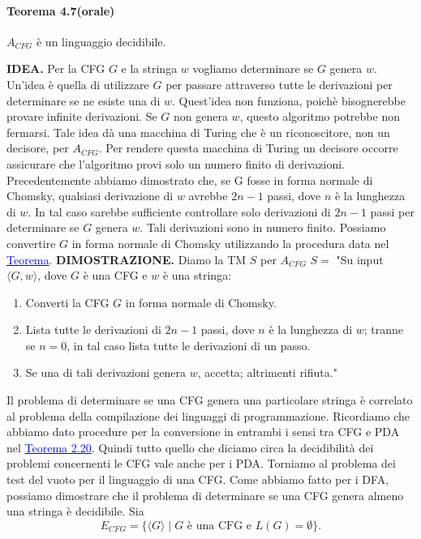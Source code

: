 \documentclass{article}
\begin{document}
\paragraph{Teorema 4.7(orale)}
\label{teorema-4.7}
$A_{CFG}$ è un linguaggio decidibile.
\newline

\hbox{\textbf{IDEA.}}
Per la CFG $G$ e la stringa $w$ vogliamo determinare se $G$ genera $w$.
Un'idea è quella di utilizzare $G$ per passare attraverso tutte le derivazioni per determinare se ne esiste una di $w$.
Quest'idea non funziona, poichè bisognerebbe provare infinite derivazioni.
Se $G$ non genera $w$, questo algoritmo potrebbe non fermarsi.
Tale idea dà una macchina di Turing che è un riconoscitore, non un decisore, per $A_{CFG}$.
Per rendere questa macchina di Turing un decisore occorre assicurare che l'algoritmo provi solo un numero finito di derivazioni.
Precedentemente abbiamo dimostrato che, se G fosse in forma normale di Chomsky, qualsiasi derivazione di $w$ avrebbe $2n - 1$ passi, dove $n$ è la lunghezza di $w$.
In tal caso sarebbe sufficiente controllare solo derivazioni di $2n - 1$ passi per determinare se $G$ genera $w$.
Tali derivazioni sono in numero finito.
Possiamo convertire $G$ in forma normale di Chomsky utilizzando la procedura data nel \hyperref[Forma normale di Chomsky]{\textcolor{blue}{Teorema}}.
\vspace{1em}
\text{}
\newline
\hbox{\textbf{DIMOSTRAZIONE.}}
Diamo la TM $S$ per $A_{CFG}$
\vspace{1em}
\text{}
\newline
$S = $ "Su input $\langle G,w \rangle$, dove $G$ è una CFG e $w$ è una stringa:
\begin{enumerate}
    \item Converti la CFG $G$ in forma normale di Chomsky.
    \item Lista tutte le derivazioni di $2n - 1$ passi, dove $n$ è la lunghezza di $w$; tranne se $n = 0$, in tal caso lista tutte le derivazioni di un passo.
    \item Se una di tali derivazioni genera $w$, accetta; altrimenti rifiuta."
\end{enumerate}

Il problema di determinare se una CFG genera una particolare stringa è correlato al problema della compilazione dei linguaggi di programmazione.
Ricordiamo che abbiamo dato procedure per la conversione in entrambi i sensi tra CFG e PDA nel \hyperref[teorema-2.20]{\textcolor{blue}{Teorema 2.20}}.
Quindi tutto quello che diciamo circa la decidibilità dei problemi concernenti le CFG vale anche per i PDA.
Torniamo al problema dei test del vuoto per il linguaggio di una CFG.
Come abbiamo fatto per i DFA, possiamo dimostrare che il problema di determinare se una CFG genera almeno una stringa è decidibile. Sia
$$
E_{CFG} = \{\langle G \rangle \mid G \text{ è una CFG e } L(G) = \emptyset \}.
$$
\end{document}

